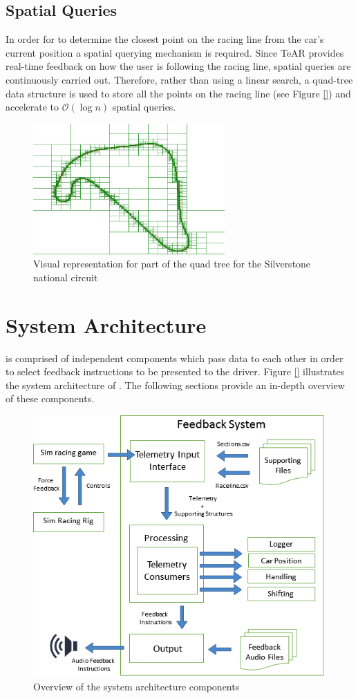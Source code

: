 \subsection{Spatial Queries}
\label{sec:imp-SpatialQuerying}
In order for \methodname to determine the closest point on the racing line from the car's current position a spatial querying mechanism is required. Since TeAR provides real-time feedback on how the user is following the racing line, spatial queries are continuously carried out. Therefore, rather than using a linear search, a quad-tree data structure \cite{} is used to store all the points on the racing line (see Figure \ref{}) and accelerate to $\mathcal{O}(\log{n})$ spatial queries. 

\begin{figure}[!htb]
	\centering
	\includegraphics[height=5cm]{images/QuadTree}
	\caption{Visual representation for part of the quad tree for the Silverstone national circuit}
	\label{fig:QuadTree}
\end{figure}

\section{System Architecture}
\label{sec:imp-systemArchitecture}
\methodname is comprised of independent components which pass data to each other in order to select feedback instructions to be presented to the driver. Figure \ref{} illustrates the system architecture of \methodname. The following sections provide an in-depth overview of these components.

\begin{figure}[!htb]
	\centering
	\includegraphics[height=10cm]{images/SystemArch}
	\caption{Overview of the system architecture components}
	\label{fig:SystemArch}
\end{figure}

